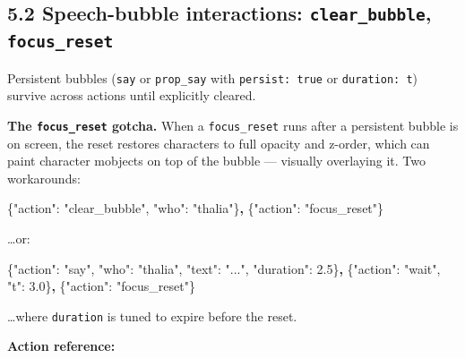 \documentclass[
  11pt,
]{book}
\newenvironment{Shaded}{}{}
\newcommand{\DataTypeTok}[1]{\textcolor[rgb]{0.56,0.13,0.00}{#1}}
\newcommand{\ErrorTok}[1]{\textcolor[rgb]{1.00,0.00,0.00}{\textbf{#1}}}
\newcommand{\FloatTok}[1]{\textcolor[rgb]{0.25,0.63,0.44}{#1}}
\newcommand{\FunctionTok}[1]{\textcolor[rgb]{0.02,0.16,0.49}{#1}}
\newcommand{\StringTok}[1]{\textcolor[rgb]{0.25,0.44,0.63}{#1}}
\begin{document}
\subsection{\texorpdfstring{5.2 Speech-bubble interactions:
\texttt{clear\_bubble},
\texttt{focus\_reset}}{5.2 Speech-bubble interactions: clear\_bubble, focus\_reset}}\label{speech-bubble-interactions-clear_bubble-focus_reset}

Persistent bubbles (\texttt{say} or \texttt{prop\_say} with
\texttt{persist:\ true} or \texttt{duration:\ t}) survive across actions
until explicitly cleared.

\textbf{The \texttt{focus\_reset} gotcha.} When a \texttt{focus\_reset}
runs after a persistent bubble is on screen, the reset restores
characters to full opacity and z-order, which can paint character
mobjects on top of the bubble --- visually overlaying it. Two
workarounds:

\begin{Shaded}
\begin{Highlighting}[]
\FunctionTok{\{}\DataTypeTok{"action"}\FunctionTok{:} \StringTok{"clear\_bubble"}\FunctionTok{,} \DataTypeTok{"who"}\FunctionTok{:} \StringTok{"thalia"}\FunctionTok{\}}\ErrorTok{,}
\FunctionTok{\{}\DataTypeTok{"action"}\FunctionTok{:} \StringTok{"focus\_reset"}\FunctionTok{\}}
\end{Highlighting}
\end{Shaded}

\ldots or:

\begin{Shaded}
\begin{Highlighting}[]
\FunctionTok{\{}\DataTypeTok{"action"}\FunctionTok{:} \StringTok{"say"}\FunctionTok{,} \DataTypeTok{"who"}\FunctionTok{:} \StringTok{"thalia"}\FunctionTok{,} \DataTypeTok{"text"}\FunctionTok{:} \StringTok{"..."}\FunctionTok{,}
 \DataTypeTok{"duration"}\FunctionTok{:} \FloatTok{2.5}\FunctionTok{\}}\ErrorTok{,}
\FunctionTok{\{}\DataTypeTok{"action"}\FunctionTok{:} \StringTok{"wait"}\FunctionTok{,} \DataTypeTok{"t"}\FunctionTok{:} \FloatTok{3.0}\FunctionTok{\}}\ErrorTok{,}
\FunctionTok{\{}\DataTypeTok{"action"}\FunctionTok{:} \StringTok{"focus\_reset"}\FunctionTok{\}}
\end{Highlighting}
\end{Shaded}

\ldots where \texttt{duration} is tuned to expire before the reset.

\textbf{Action reference:}
\end{document}
